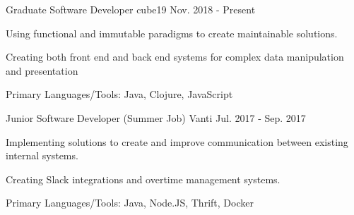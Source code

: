 

\begin{cventries}


  \cventry
    {Graduate Software Developer} %
    {cube19} %
    {} %
    {Nov. 2018 - Present} %
    {
      \begin{cvmitems} %
        \item {Using functional and immutable paradigms to create maintainable
          solutions.}
        \item {Creating both front end and back end systems for complex data
          manipulation and presentation}
        \item {Primary Languages/Tools: Java, Clojure, JavaScript}
      \end{cvmitems}
    }


  \cventry
    {Junior Software Developer (Summer Job)} %
    {Vanti} %
    {} %
    {Jul. 2017 - Sep. 2017} %
    {
      \begin{cvmitems} %
        \item {Implementing solutions to create and improve communication
          between existing internal systems.}
        \item {Creating Slack integrations and overtime management systems.}
        \item {Primary Languages/Tools: Java, Node.JS, Thrift, Docker}
      \end{cvmitems}
    }



\end{cventries}
